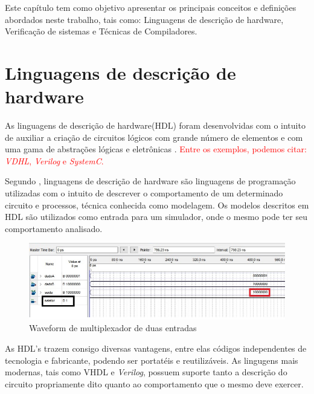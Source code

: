 \label{chapter:conceitos}
Este capítulo tem como objetivo apresentar os principais conceitos e definições abordados neste trabalho, tais como: Linguagens de descrição de hardware, Verificação de sistemas e Técnicas de Compiladores.

\section{Linguagens de descrição de hardware}

As linguagens de descrição de hardware(HDL) foram desenvolvidas com o intuito de auxiliar a criação de circuitos lógicos com grande número de elementos e com uma gama de abstrações lógicas e eletrônicas \cite{thomas2008verilog}. \textcolor{red}{Entre os exemplos, podemos citar: \textit{VDHL}, \textit{Verilog} e \textit{SystemC}.}

\par
Segundo \cite{christen1999vhdl}, linguagens de descrição de hardware são linguagens de programação utilizadas com o intuito de descrever o comportamento de um determinado circuito e processos, técnica conhecida como modelagem. Os modelos descritos em HDL são utilizados como entrada para um simulador, onde o mesmo pode ter seu comportamento analisado.

\begin{figure}[htb]
	\begin{center}
    \caption{\label{fig:waveform_fig}Waveform de multiplexador de duas entradas}
	\includegraphics[scale=0.55]{Figuras/Waveform_multiplex.png}
	\end{center}
\end{figure}

\par
As HDL's trazem consigo diversas vantagens, entre elas códigos independentes de tecnologia e fabricante, podendo ser portatéis e reutilizáveis\cite{cappelattipraticando}. As lingugens mais modernas, tais como VHDL e \textit{Verilog}, possuem suporte tanto a descrição do circuito propriamente dito quanto ao comportamento que o mesmo deve exercer\cite{christen1999vhdl}.

